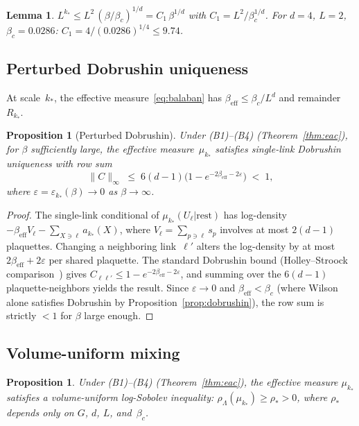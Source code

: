 \documentclass[11pt,a4paper]{article}
\theoremstyle{plain}
\newtheorem{proposition}[theorem]{Proposition}
\newtheorem{lemma}[theorem]{Lemma}
\theoremstyle{definition}
\theoremstyle{remark}
\begin{document}
\begin{lemma}\label{lem:kstar}
$L^{k_*} \leq L^2\,(\beta/\beta_c)^{1/d}
= C_1\,\beta^{1/d}$
with $C_1 = L^2/\beta_c^{1/d}$.
For $d = 4$, $L = 2$, $\beta_c = 0.0286$:
$C_1 = 4/(0.0286)^{1/4} \leq 9.74$.
\end{lemma}

\subsection{Perturbed Dobrushin uniqueness}

At scale~$k_*$, the effective measure~\eqref{eq:balaban}
has $\beta_{\mathrm{eff}} \leq \beta_c/L^d$ and remainder~$R_{k_*}$.

\begin{proposition}[Perturbed Dobrushin]
\label{prop:perturbed_dob}
Under (B1)--(B4) (Theorem~\ref{thm:eac}), for $\beta$ sufficiently
large, the effective measure~$\mu_{k_*}$ satisfies
single-link Dobrushin uniqueness with row sum
\begin{equation}
  \|C\|_\infty \;\leq\;
  6(d{-}1)\bigl(1 - e^{-2\beta_{\mathrm{eff}} - 2\varepsilon}\bigr)
  \;<\; 1,
\end{equation}
where $\varepsilon = \varepsilon_{k_*}(\beta)
\to 0$ as $\beta \to \infty$.
\end{proposition}

\begin{proof}
The single-link conditional of $\mu_{k_*}(U_\ell | \text{rest})$
has log-density
$-\beta_{\mathrm{eff}} V_\ell - \sum_{X \ni \ell} a_{k_*}(X)$,
where $V_\ell = \sum_{p \ni \ell} s_p$ involves at most
$2(d{-}1)$ plaquettes.  Changing a neighboring link~$\ell'$
alters the log-density by at most
$2\beta_{\mathrm{eff}} + 2\varepsilon$ per shared plaquette.
The standard Dobrushin bound
(Holley--Stroock comparison~\cite{HolleyStroock}) gives
$C_{\ell\ell'} \leq 1 - e^{-2\beta_{\mathrm{eff}} - 2\varepsilon}$,
and summing over the $6(d{-}1)$ plaquette-neighbors yields
the result.  Since $\varepsilon \to 0$ and
$\beta_{\mathrm{eff}} < \beta_c$ (where Wilson alone satisfies
Dobrushin by Proposition~\ref{prop:dobrushin}), the row sum
is strictly $< 1$ for $\beta$ large enough.
\end{proof}

\subsection{Volume-uniform mixing}

\begin{proposition}\label{prop:mixing}
Under (B1)--(B4) (Theorem~\ref{thm:eac}), the effective measure
$\mu_{k_*}$ satisfies a volume-uniform log-Sobolev inequality:
$\rho_\Lambda(\mu_{k_*}) \geq \rho_* > 0$,
where $\rho_*$ depends only on $G$, $d$, $L$, and~$\beta_c$.
\end{proposition}
\end{document}
